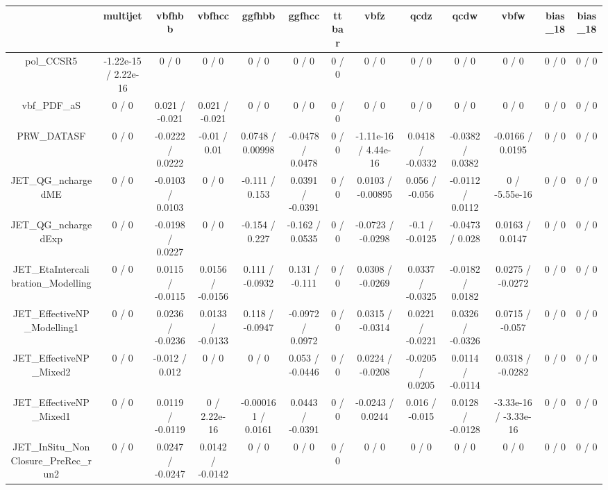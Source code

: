 \documentclass[10pt]{article}
\begin{document}
\begin{table}[htbp]
\begin{center}
\begin{tabular}{|c|c|c|c|c|c|c|c|c|c|c|c|c|}
\hline 
      & multijet      & vbfhbb      & vbfhcc      & ggfhbb      & ggfhcc      & ttbar      & vbfz      & qcdz      & qcdw      & vbfw      & bias_18      & bias_18 \\ 
\hline 
  pol_CCSR5 & -1.22e-15 / 2.22e-16 & 0 / 0 & 0 / 0 & 0 / 0 & 0 / 0 & 0 / 0 & 0 / 0 & 0 / 0 & 0 / 0 & 0 / 0 & 0 / 0 & 0 / 0 \\ 
  vbf_PDF_aS & 0 / 0 & 0.021 / -0.021 & 0.021 / -0.021 & 0 / 0 & 0 / 0 & 0 / 0 & 0 / 0 & 0 / 0 & 0 / 0 & 0 / 0 & 0 / 0 & 0 / 0 \\ 
  PRW_DATASF & 0 / 0 & -0.0222 / 0.0222 & -0.01 / 0.01 & 0.0748 / 0.00998 & -0.0478 / 0.0478 & 0 / 0 & -1.11e-16 / 4.44e-16 & 0.0418 / -0.0332 & -0.0382 / 0.0382 & -0.0166 / 0.0195 & 0 / 0 & 0 / 0 \\ 
  JET_QG_nchargedME & 0 / 0 & -0.0103 / 0.0103 & 0 / 0 & -0.111 / 0.153 & 0.0391 / -0.0391 & 0 / 0 & 0.0103 / -0.00895 & 0.056 / -0.056 & -0.0112 / 0.0112 & 0 / -5.55e-16 & 0 / 0 & 0 / 0 \\ 
  JET_QG_nchargedExp & 0 / 0 & -0.0198 / 0.0227 & 0 / 0 & -0.154 / 0.227 & -0.162 / 0.0535 & 0 / 0 & -0.0723 / -0.0298 & -0.1 / -0.0125 & -0.0473 / 0.028 & 0.0163 / 0.0147 & 0 / 0 & 0 / 0 \\ 
  JET_EtaIntercalibration_Modelling & 0 / 0 & 0.0115 / -0.0115 & 0.0156 / -0.0156 & 0.111 / -0.0932 & 0.131 / -0.111 & 0 / 0 & 0.0308 / -0.0269 & 0.0337 / -0.0325 & -0.0182 / 0.0182 & 0.0275 / -0.0272 & 0 / 0 & 0 / 0 \\ 
  JET_EffectiveNP_Modelling1 & 0 / 0 & 0.0236 / -0.0236 & 0.0133 / -0.0133 & 0.118 / -0.0947 & -0.0972 / 0.0972 & 0 / 0 & 0.0315 / -0.0314 & 0.0221 / -0.0221 & 0.0326 / -0.0326 & 0.0715 / -0.057 & 0 / 0 & 0 / 0 \\ 
  JET_EffectiveNP_Mixed2 & 0 / 0 & -0.012 / 0.012 & 0 / 0 & 0 / 0 & 0.053 / -0.0446 & 0 / 0 & 0.0224 / -0.0208 & -0.0205 / 0.0205 & 0.0114 / -0.0114 & 0.0318 / -0.0282 & 0 / 0 & 0 / 0 \\ 
  JET_EffectiveNP_Mixed1 & 0 / 0 & 0.0119 / -0.0119 & 0 / 2.22e-16 & -0.000161 / 0.0161 & 0.0443 / -0.0391 & 0 / 0 & -0.0243 / 0.0244 & 0.016 / -0.015 & 0.0128 / -0.0128 & -3.33e-16 / -3.33e-16 & 0 / 0 & 0 / 0 \\ 
  JET_InSitu_NonClosure_PreRec_run2 & 0 / 0 & 0.0247 / -0.0247 & 0.0142 / -0.0142 & 0 / 0 & 0 / 0 & 0 / 0 & 0 / 0 & 0 / 0 & 0 / 0 & 0 / 0 & 0 / 0 & 0 / 0 \\ 

\end{tabular}
\end{center}
\end{table}
\end{document}
